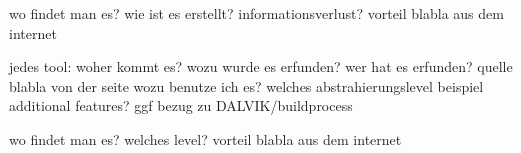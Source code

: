 wo findet man es?\newline
wie ist es erstellt?\newline
informationsverlust?\newline
vorteil\newline
blabla aus dem internet\newline

jedes tool:\newline
woher kommt es?\newline
wozu wurde es erfunden?\newline
wer hat es erfunden? quelle\newline
blabla von der seite\newline
wozu benutze ich es?\newline
welches abstrahierungslevel\newline
beispiel\newline
additional features?\newline
ggf bezug zu DALVIK/buildprocess\newline

wo findet man es?\newline
welches level?\newline
vorteil\newline
blabla aus dem internet\newline
